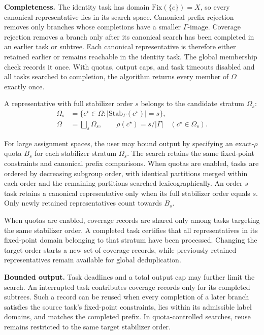 \documentclass[a5paper, 10pt]{article}
\begin{document}
\medskip
\noindent\textbf{Completeness.}
The identity task has domain $\mathrm{Fix}(\{e\})=X$, so every canonical representative lies in its search space. Canonical prefix rejection removes only branches whose completions have a smaller $\Gamma$-image. Coverage rejection removes a branch only after its canonical search has been completed in an earlier task or subtree. Each canonical representative is therefore either retained earlier or remains reachable in the identity task. The global membership check records it once. With quotas, output caps, and task timeouts disabled and all tasks searched to completion, the algorithm returns every member of $\Omega$ exactly once.

A representative with full stabilizer order $s$ belongs to the candidate stratum $\Omega_s$:
\begin{equation}
\begin{aligned}
\Omega_s&=\{c^\star\in\Omega:|\mathrm{Stab}_{\Gamma}(c^\star)|=s\},\\
\Omega&=\bigsqcup_s\Omega_s,\qquad
\rho(c^\star)=s/|\Gamma|\quad(c^\star\in\Omega_s).
\end{aligned}
\label{eq:rho_strata}
\end{equation}

For large assignment spaces, the user may bound output by specifying an exact-$\rho$ quota $B_s$ for each stabilizer stratum $\Omega_s$. The search retains the same fixed-point constraints and canonical prefix comparisons. When quotas are enabled, tasks are ordered by decreasing subgroup order, with identical partitions merged within each order and the remaining partitions searched lexicographically. An order-$s$ task retains a canonical representative only when its full stabilizer order equals $s$. Only newly retained representatives count towards $B_s$.

When quotas are enabled, coverage records are shared only among tasks targeting the same stabilizer order. A completed task certifies that all representatives in its fixed-point domain belonging to that stratum have been processed. Changing the target order starts a new set of coverage records, while previously retained representatives remain available for global deduplication.

\medskip
\noindent\textbf{Bounded output.}
Task deadlines and a total output cap may further limit the search. An interrupted task contributes coverage records only for its completed subtrees. Such a record can be reused when every completion of a later branch satisfies the source task's fixed-point constraints, lies within its admissible label domains, and matches the completed prefix. In quota-controlled searches, reuse remains restricted to the same target stabilizer order.
\end{document}

